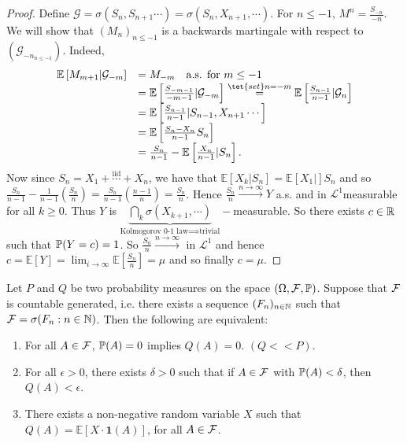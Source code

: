 \documentclass{article}
\begin{document}
\begin{proof}
    Define $\mathcal{G} = \sigma(S_{n}, S_{n+1}\cdots)  = \sigma(S_{n}, X_{n+1}, \cdots)$. For $ n\leq -1$, $ M^{n} = \frac{S_{-n}}{-n}$. We will show that $ (M_{n})_{n\leq -1}$ is a backwards martingale with respect to $ (\mathcal{G}_{-n}_{n\leq -1} )$. Indeed, 
    \[
    \begin{array}{ll}
	    \mathbb{E}\left[ M_{m+1}|\mathcal{G}_{-m}  \right] &= M_{-m}  \quad \text{a.s. for } m\leq -1\\         &= \mathbb{E}\left[ \frac{S_{-m-1}}{-m-1} |\mathcal{G}_{-m}  \right] \stackrel{\tet{set }n = -m}{=} \mathbb{E}\left[ \frac{S_{n-1}}{n-1} | \mathcal{G}_{n}  \right]\\ 
							       & = \mathbb{E}\left[ \frac{S_{n-1}}{n-1}| S_{n-1}, X_{n+1}\cdots \right]\\ 
							       &= \mathbb{E}\left[ \frac{S_{n}-X_{n}}{n-1}S_{n} \right] \\ 
							       & = \frac{S_{n}}{n-1}-\mathbb{E}\left[ \frac{X_{n}}{n-1}|S_{n} \right].
    \end{array}
    \]
    Now since $ S_{n} = X_{1} +\stackrel{\text{iid}}{\cdots}+X_{n}$, we have that $ \mathbb{E}\left[ X_{k}|S_{n} \right]= \mathbb{E}\left[ X_{1}| \right]S_{n}$ and so $ \frac{S_{n}}{n-1}-\frac{1}{n-1} \left( \frac{S_{n}}{n} \right) = \frac{S_{n}}{n-1} \left( \frac{n-1}{n} \right) = \frac{S_{n}}{n}$. Hence $ \frac{S_{n}}{n} \stackrel{n\to \infty}{\longrightarrow} Y$ a.s. and in $ \mathcal{L}^{1} $measurable for all $ k\geq 0$. Thus $ Y$ is $\displaystyle\underbrace{\bigcap_{k} \sigma(X_{k+1}, \cdots )}_{\text{Kolmogorov 0-1 law}\implies \text{trivial}}-$measurable. So there exists $ c\in \mathbb{R}$ such that $ \mathbb{P}(Y = c)  = 1$. So $ \frac{S_{n}}{n}\stackrel{n\to \infty}{\longrightarrow}$ in $ \mathcal{L}^{1} $ and hence $ c = \mathbb{E}\left[ Y \right] = \lim_{i \to \infty} \mathbb{E}\left[ \frac{S_{n}}{n} \right] = \mu$ and so finally $ c = \mu$. 
\end{proof}

\begin{theorem}\label{thm: radon nokodym thm}
Let $ P$ and $ Q$ be two probability measures on the space $ (\Omega, \mathcal{F}, \mathbb{P})$. Suppose that $\mathcal{F} $ is countable generated, i.e. there exists a sequence $ (F_{n})_{n\in \mathbb{N}}$ such that $ \mathcal{F} = \sigma(F_{n}: n\in \mathbb{N})$. Then the following are equivalent: 

\begin{enumerate}
	\item For all $ A\in \mathcal{F}$, $\mathbb{P}(A) = 0$ implies $ Q(A) = 0$. $ (Q<<P)$.
	\item For all $ \epsilon >0$, there exists $ \delta>0$ such that if $ A\in \mathcal{F}$ with $ \mathbb{P}(A)<\delta$, then $ Q(A)<\epsilon$. 
	\item There exists a non-negative random variable $ X$ such that $ Q(A) = \mathbb{E}\left[ X\cdot \mathbf{1}(A) \right]$, for all $ A\in \mathcal{F}$.
\end{enumerate}

\end{theorem}
\end{document}

